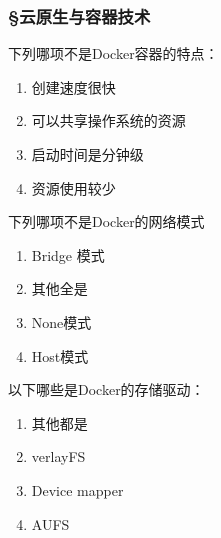 \subsubsection*{\S 云原生与容器技术}
\setcounter{problemname}{0}

\begin{problem}
	下列哪项不是Docker容器的特点：
    \vspace{-0.8em}
    \begin{multicols}{2}
        \begin{enumerate}[label=\Alph*.]
            \item 创建速度很快
            \item 可以共享操作系统的资源
            \item 启动时间是分钟级
            \item 资源使用较少
        \end{enumerate}
    \end{multicols}
    \vspace{-1em}
\end{problem}



\begin{problem}
	下列哪项不是Docker的网络模式
    \vspace{-0.8em}
    \begin{multicols}{4}
        \begin{enumerate}[label=\Alph*.]
            \item Bridge 模式
            \item 其他全是
            \item None模式
            \item Host模式
        \end{enumerate}
    \end{multicols}
    \vspace{-1em}
\end{problem}



\begin{problem}
    以下哪些是Docker的存储驱动：
    \vspace{-0.8em}
    \begin{multicols}{4}
        \begin{enumerate}[label=\Alph*.]
            \item 其他都是
            \item verlayFS
            \item Device mapper
            \item AUFS
        \end{enumerate}
    \end{multicols}
    \vspace{-1em}
\end{problem}



